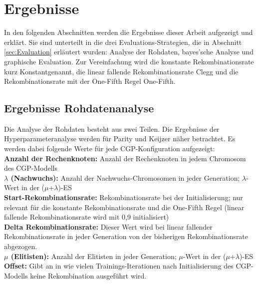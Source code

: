 \chapter{Ergebnisse}
\label{Ergebnisse}

In den folgenden Abschnitten werden die Ergebnisse dieser Arbeit aufgezeigt und erklärt.
Sie sind unterteilt in die drei Evaluations-Strategien, die in Abschnitt \ref{sec:Evaluation} erläutert wurden: Analyse der Rohdaten, bayes'sche Analyse und graphische Evaluation.
Zur Vereinfachung wird die konstante Rekombinationsrate kurz \glqq Konstant\grqq\space genannt, die linear fallende Rekombinationsrate \glqq Clegg \grqq\space und die Rekombinationsrate mit der One-Fifth Regel \glqq One-Fifth\grqq.

\section{Ergebnisse Rohdatenanalyse}
\label{sec:ergebnisseRohdaten}

Die Analyse der Rohdaten besteht aus zwei Teilen.
Die Ergebnisse der Hyperparameteranalyse werden für Parity und Keijzer näher betrachtet.
Es werden dabei folgende Werte für jede CGP-Konfiguration aufgezeigt:\\
\textbf{Anzahl der Rechenknoten:} Anzahl der Rechenknoten in jedem Chromosom des CGP-Modells\\
\textbf{$\lambda$ (Nachwuchs):} Anzahl der Nachwuchs-Chromosomen in jeder Generation; $\lambda$-Wert in der ($\mu$+$\lambda$)-ES\\
\textbf{Start-Rekombinationsrate:} Rekombinationsrate bei der Initialisierung; nur relevant für die konstante Rekombinationsrate und die One-Fifth Regel (linear fallende Rekombinationsrate wird mit 0,9 initialisiert)\\
\textbf{Delta Rekombinationsrate:} Dieser Wert wird bei linear fallender Rekombinationsrate in jeder Generation von der bisherigen Rekombinationsrate abgezogen.\\
\textbf{$\mu$ (Elitisten):} Anzahl der Elitisten in jeder Generation; $\mu$-Wert in der ($\mu$+$\lambda$)-ES\\
\textbf{Offset:} Gibt an in wie vielen Trainings-Iterationen nach Initialisierung des CGP-Modells keine Rekombination ausgeführt wird.

